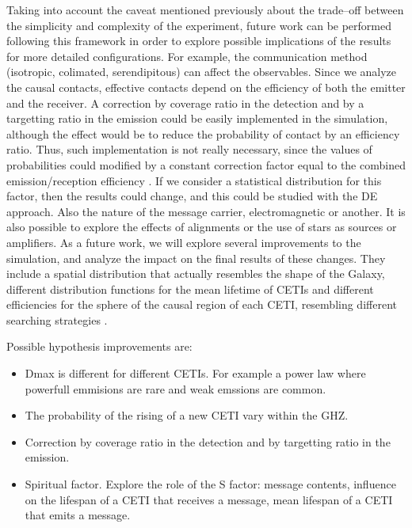 \documentclass[crop]{CSLB}%
\begin{document}
Taking into account the caveat mentioned previously about the
trade--off between the simplicity and complexity of the experiment,
future work can be performed following this framework in order to
explore possible implications of the results for more detailed
configurations.
%
For example, the communication method (isotropic, colimated,
serendipitous) can affect the observables.
%
Since we analyze the causal contacts, effective contacts depend on the
efficiency of both the emitter and the receiver.
%
A correction by coverage ratio in the detection and by a targetting
ratio in the emission could be easily implemented in the simulation,
although the effect would be to reduce the probability of contact by
an efficiency ratio.
%
Thus, such implementation is not really necessary, since the values of
probabilities could modified by a constant correction factor equal to
the combined emission/reception efficiency
\citep{smith_broadcasting_2009, anchordoqui_upper_2019, forgan_collimated_2014}.
%
If we consider a statistical distribution for this factor, then the
results could change, and this could be studied with the DE approach.
%
Also the nature of the message carrier, electromagnetic or another.
%
It is also possible to explore the effects of alignments or the use of
stars as sources or amplifiers.
%
%
As a future work, we will explore several improvements to the
simulation, and analyze the impact on the final results of these
changes.
%
They include a spatial distribution that actually resembles the shape
of the Galaxy, different distribution functions for the mean lifetime
of CETIs and different efficiencies for the sphere of the causal
region of each CETI, resembling different searching strategies
\citep{hippke_interstellar_2017}.


Possible hypothesis improvements are:

\begin{itemize}
   \item Dmax is different for different CETIs.  For example a power
      law where powerfull emmisions are rare and weak emssions are
      common.
   \item The probability of the rising of a new CETI vary within the
      GHZ.
   \item Correction by coverage ratio in the detection and by
      targetting ratio in the emission.
   \item Spiritual factor.  Explore the role of the S factor: message
      contents, influence on the lifespan of a CETI that receives a
      message, mean lifespan of a CETI that emits a message.
\end{itemize} 

 





\end{document}
